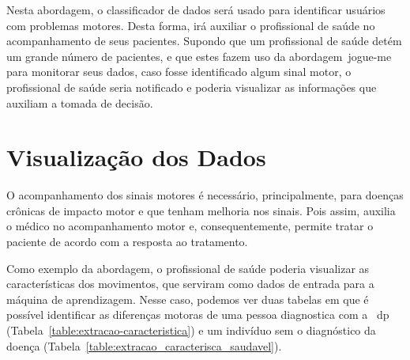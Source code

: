 Nesta abordagem, o classificador de dados será usado para identificar usuários com problemas motores. Desta forma, irá auxiliar o profissional de saúde no acompanhamento de seus pacientes. Supondo que um profissional de saúde detém um grande número de pacientes, e que estes fazem uso da abordagem~\ac{jogue-me} para monitorar seus dados, caso fosse identificado algum sinal motor, o profissional de saúde seria notificado e poderia visualizar as informações que auxiliam a tomada de decisão.





\section{Visualização dos Dados}
O acompanhamento dos sinais motores é necessário, principalmente, para doenças crônicas de impacto motor e que tenham melhoria nos sinais. Pois assim, auxilia o médico no acompanhamento motor e, consequentemente, permite tratar o paciente de acordo com a resposta ao tratamento.

Como exemplo da abordagem, o profissional de saúde poderia visualizar as características dos movimentos, que serviram como dados de entrada para a máquina de aprendizagem. Nesse caso, podemos ver duas tabelas em que é possível identificar as diferenças motoras de uma pessoa diagnostica com a ~\ac{dp} (Tabela~\ref{table:extracao-caracteristica}) e um indivíduo sem o diagnóstico da doença (Tabela~\ref{table:extracao_caracterisca_saudavel}).

